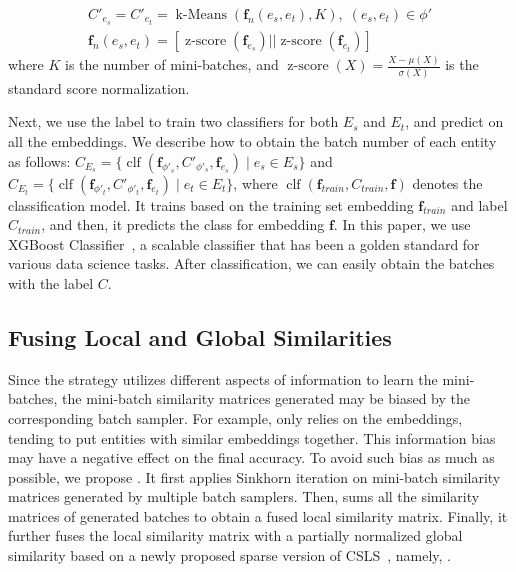 \begin{equation}
\begin{array}{c}
    C'_{e_s} = C'_{e_t} = \operatorname{k-Means}(\mathbf{f}_{n}(e_s,e_t), K), \; (e_s, e_t) \in \phi'\\
    \mathbf{f}_{n}(e_s,e_t)= [\operatorname{z-score}(\mathbf{f}_{e_s})||\operatorname{z-score}(\mathbf{f}_{e_t})]
\end{array}
\end{equation}
where $K$ is the number of mini-batches, and $\operatorname{z-score}(X)=  \frac{X - \mu(X)}{\sigma(X)}$ is the standard score normalization.

Next, we use the label to train two classifiers for both $E_s$ and $E_t$, and predict on all the embeddings. We describe how to obtain the batch number of each entity as follows: $C_{E_s} = \{ \operatorname{clf}(\mathbf{f}_{\phi'_s}, C'_{\phi'_s}, \mathbf{f}_{e_s}) \;|\; e_s \in E_s \}$ and $
    C_{E_t} = \{ \operatorname{clf}(\mathbf{f}_{\phi'_t}, C'_{\phi'_t}, \mathbf{f}_{e_t}) \;|\; e_t \in E_t \}$, 
where $\operatorname{clf}(\mathbf{f}_{train}, C_{train}, \mathbf{f})$ denotes the classification model. It trains based on the training set embedding $\mathbf{f}_{train}$ and label $C_{train}$, and then, it predicts the class for embedding $\mathbf{f}$. In this paper, we use XGBoost Classifier~\cite{XGBoost16}, a scalable classifier that has been a golden standard for various data science tasks. After classification, we can easily obtain the batches with the label $C$.

\subsection{Fusing Local and Global Similarities}

Since the \Sampling{} strategy utilizes different aspects of information to learn the mini-batches, the mini-batch similarity matrices generated may be biased by the corresponding batch sampler. For example, \KMeans{} only relies on the embeddings, tending to put entities with similar embeddings together. This information bias may have a negative effect on the final accuracy. To avoid such bias as much as possible, we propose \Merging{}. It first applies Sinkhorn iteration on mini-batch similarity matrices generated by multiple batch samplers. Then, \Merging{} sums all the similarity matrices of generated batches to obtain a fused local similarity matrix. Finally, it further fuses the local similarity matrix with a partially normalized global similarity based on a newly proposed sparse version of CSLS~\cite{CSLS}, namely, \SparseCSLS{}.



